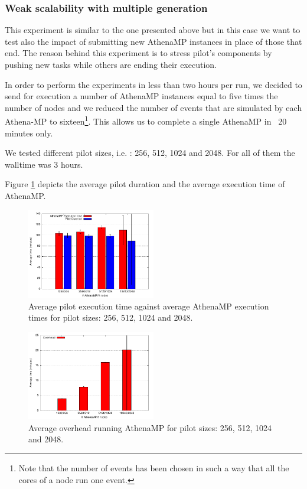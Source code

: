 \subsubsection{Weak scalability with multiple generation }
This experiment is similar to the one presented above but in this case we want to test also the impact of submitting new AthenaMP instances in place of those that end. The reason behind this experiment is to stress pilot's components by pushing new tasks while others are ending their execution.

In order to perform the experiments in less than two hours per run, we decided to send for execution a number of AthenaMP instances equal to five times the number of nodes and we reduced  the number of events that are simulated by each Athena-MP to sixteen\footnote{Note that the number of events has been chosen in such a way that all the cores of a node run one event.}. This allows us to complete a single AthenaMP in ~20 minutes only. 

We tested different pilot sizes, i.e. : 256, 512, 1024 and 2048. For all of them the walltime was 3 hours. 

Figure \ref{fig:weakScal2a} depicts the average pilot duration and  the average execution time of AthenaMP.  

\begin{figure}[!htb]
        \includegraphics[width=0.5\textwidth]{./figures/NGE/weakET2.pdf}
    \caption{Average pilot execution time against average AthenaMP execution times  for pilot sizes: 256, 512, 1024 and 2048.}
\label{fig:weakScal2a}
\end{figure}
\begin{figure}[!htb]
        \includegraphics[width=0.5\textwidth]{./figures/NGE/weakOver2.pdf}
    \caption{Average overhead running AthenaMP for pilot sizes: 256, 512, 1024 and 2048.}
\label{fig:weakScal2b}
\end{figure}
